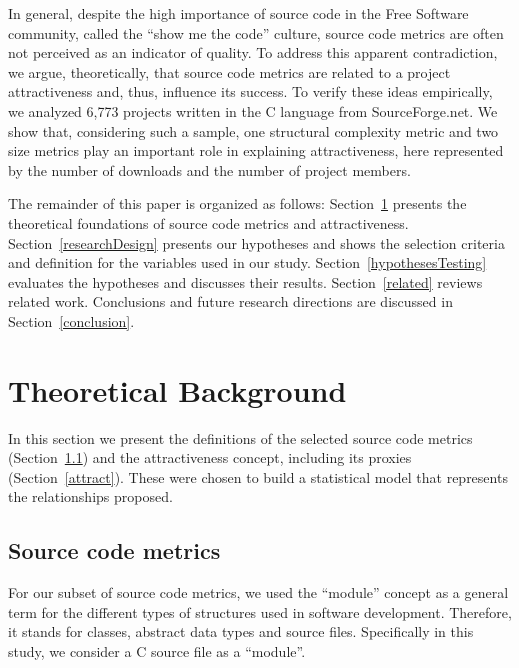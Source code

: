 \documentclass[conference]{IEEEtran}
\newcommand{\TODO}[1]{{\color{red}\textbf{\uwave{#1}}}}
\begin{document}
In general, despite the high importance of source code in the Free Software
community, called the ``show me the code'' culture, source code metrics are
often not perceived as an indicator of quality.
%
To address this apparent contradiction, we argue, theoretically, that source
code metrics are related to a project attractiveness and, thus, influence its success.
%
To verify these ideas empirically, we analyzed 6,773 projects
written in the C language from SourceForge.net.
%
We show that, considering such a sample, one structural complexity metric
and two size metrics play an important role in explaining attractiveness,
here represented by the number of downloads and the number of project members.



The remainder of this paper is organized as follows:
%
Section~\ref{background} presents the theoretical foundations of source code
metrics and attractiveness.
%
Section~\ref{researchDesign} presents our hypotheses and shows the selection
criteria and definition for the variables used in our study.
%
Section~\ref{hypothesesTesting} evaluates the hypotheses and discusses 
their results.
%
Section~\ref{related} reviews related work.
%
Conclusions and future research directions are discussed in Section~\ref{conclusion}.

\section{Theoretical Background}
\label{background}

In this section we present the definitions of the selected source code metrics
(Section~\ref{scm}) and the attractiveness concept, including its proxies (Section~\ref{attract}).
These were chosen to build a statistical model that represents the relationships proposed.

\subsection{Source code metrics}
\label{scm}

For our subset of source code metrics, we used the ``module'' concept
as a general term for the different types of structures used in software
development. Therefore, it stands for classes, abstract data types and source files. 
%
Specifically in this study, we consider a C source file as a ``module''.
\end{document}
